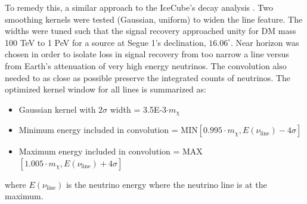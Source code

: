 To remedy this, a similar approach to the IceCube's decay analysis \cite{Minjin_icrc23}.
Two smoothing kernels were tested (Gaussian, uniform) to widen the line feature.
The widths were tuned such that the signal recovery approached unity for DM mass 100 TeV to 1 PeV for a source at Segue 1's declination, $16.06^\circ$.
Near horizon was chosen in order to isolate loss in signal recovery from too narrow a line versus from Earth's attenuation of very high energy neutrinos.
The convolution also needed to as close as possible preserve the integrated counts of neutrinos.
The optimized kernel window for all lines is summarized as:
\begin{itemize}
    \item Gaussian kernel with $2 \sigma$ width = 3.5E-3$\cdot m_\chi$
    \item Minimum energy included in convolution = MIN$[0.995 \cdot m_\chi, E(\nu_\mathrm{line}) -4\sigma]$
    \item Maximum energy included in convolution = MAX$[1.005 \cdot m_\chi, E(\nu_\mathrm{line}) +4\sigma]$
\end{itemize}
where $E(\nu_{\mathrm{line}})$ is the neutrino energy where the neutrino line is at the maximum.

